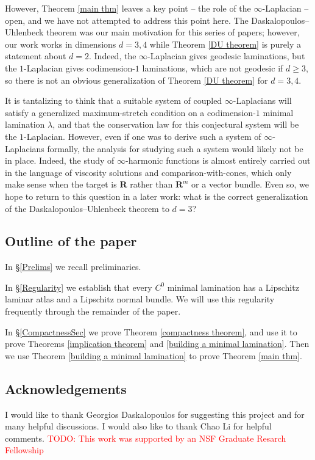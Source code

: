 \documentclass[reqno,11pt]{amsart}
\newcommand{\RR}{\mathbf{R}}
\theoremstyle{definition}
\numberwithin{equation}{section}
\newcommand\todo[1]{\textcolor{red}{TODO: #1}}
\begin{document}
However, Theorem \ref{main thm} leaves a key point -- the role of the $\infty$-Laplacian -- open, and we have not attempted to address this point here.
The Daskalopoulos--Uhlenbeck theorem was our main motivation for this series of papers; however, our work works in dimensions $d = 3, 4$ while Theorem \ref{DU theorem} is purely a statement about $d = 2$.
Indeed, the $\infty$-Laplacian gives geodesic laminations, but the $1$-Laplacian gives codimension-$1$ laminations, which are not geodesic if $d \geq 3$, so there is not an obvious generalization of Theorem \ref{DU theorem} for $d = 3, 4$.

It is tantalizing to think that a suitable system of coupled $\infty$-Laplacians will satisfy a generalized maximum-stretch condition on a codimension-$1$ minimal lamination $\lambda$, and that the conservation law for this conjectural system will be the $1$-Laplacian.
However, even if one was to derive such a system of $\infty$-Laplacians formally, the analysis for studying such a system would likely not be in place.
Indeed, the study of $\infty$-harmonic functions is almost entirely carried out in the language of viscosity solutions and comparison-with-cones, which only make sense when the target is $\RR$ rather than $\RR^m$ or a vector bundle.
Even so, we hope to return to this question in a later work: what is the correct generalization of the Daskalopoulos--Uhlenbeck theorem to $d = 3$?

\subsection{Outline of the paper}
In \S\ref{Prelims} we recall preliminaries.

In \S\ref{Regularity} we establish that every $C^0$ minimal lamination has a Lipschitz laminar atlas and a Lipschitz normal bundle.
We will use this regularity frequently through the remainder of the paper.

In \S\ref{CompactnessSec} we prove Theorem \ref{compactness theorem},
and use it to prove Theorems \ref{implication theorem} and \ref{building a minimal lamination}.
Then we use Theorem \ref{building a minimal lamination} to prove Theorem \ref{main thm}.


\subsection{Acknowledgements}
I would like to thank Georgios Daskalopoulos for suggesting this project and for many helpful discussions.
I would also like to thank Chao Li for helpful comments.
\todo{This work was supported by an NSF Graduate Resarch Fellowship}
\end{document}
